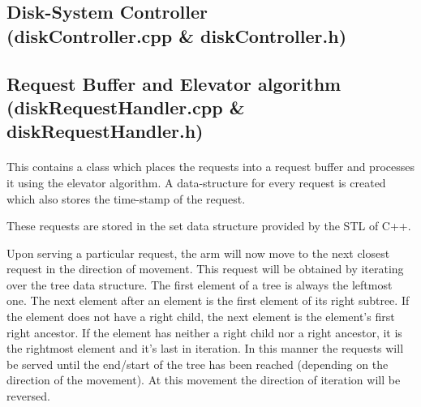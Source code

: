 \documentclass[11pt]{article}
\begin{document}
\subsection{Disk-System Controller \\ (diskController.cpp \& diskController.h)}
\paragraph{}


\subsection{Request Buffer and Elevator algorithm \\ (diskRequestHandler.cpp \& diskRequestHandler.h)}
\paragraph{}
This contains a class which places the requests into a request buffer and processes it using the elevator algorithm. A data-structure for every request is created which also stores the time-stamp of the request.

These requests are stored in the set data structure provided by the STL of C++.

Upon serving a particular request, the arm will now move to the next closest request in the direction of movement. This request will be obtained by iterating over the tree data structure. The first element of a tree is always the leftmost one. The next element after an element is the first element of its right subtree. If the element does not have a right child, the next element is the element's first right ancestor. If the element has neither a right child nor a right ancestor, it is the rightmost element and it's last in iteration. In this manner the requests will be served until the end/start of the tree has been reached (depending on the direction of the movement). At this movement the direction of iteration will be reversed. 
\end{document}
